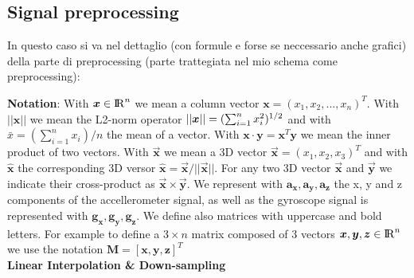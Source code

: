 \subsection{Signal preprocessing}

In questo caso si va nel dettaglio (con formule e forse se neccessario anche grafici) della parte di preprocessing (parte trattegiata nel mio schema come preprocessing):

\textbf{Notation}: With $\boldsymbol{x} \in {\rm I\!R}^{n}$ we mean a column vector $\boldsymbol{x}=(x_{1}, x_{2}, ..., x_{n})^{T}$.  With $\boldsymbol{||x||}$ we mean the L2-norm operator $||\boldsymbol{x}|| = (\sum_{i=1}^{n} x_{i}^{2})^{1/2}$ and with $\bar{x} = (\sum_{i=1}^{n} x_{i}) / n$ the mean of a vector. With $\boldsymbol{x} \cdot \boldsymbol{y} =\boldsymbol{x}^{T}\boldsymbol{y} $ we mean the inner product of two vectors. With $\boldsymbol{\vec{x}}$ we mean a 3D vector $\boldsymbol{\vec{x}} = (x_{1}, x_{2}, x_{3})^{T}$ and with $\boldsymbol{\hat{x}}$ the corresponding 3D versor $\boldsymbol{\hat{x}}=\boldsymbol{\vec{x}}/ ||\boldsymbol{\vec{x}}||$. For any two 3D vector $\boldsymbol{\vec{x}}$ and $\boldsymbol{\vec{y}}$ we indicate their cross-product as $\boldsymbol{\vec{x}} \times \boldsymbol{\vec{y}}$. We represent with $\boldsymbol{a_{x}}, \boldsymbol{a_{y}}, \boldsymbol{a_{z}}$ the x, y and z components of the accellerometer signal, as well as the gyroscope signal is represented with $\boldsymbol{g_{x}}, \boldsymbol{g_{y}}, \boldsymbol{g_{z}}$. We define also matrices with uppercase and bold letters. For example to define a $3 \times n$ matrix composed of 3 vectors $\boldsymbol{x}, \boldsymbol{y}, \boldsymbol{z} \in {\rm I\!R}^{n}$ we use the notation $\boldsymbol{M} = [\boldsymbol{x}, \boldsymbol{y}, \boldsymbol{z}]^{T}$\\

\textbf{Linear Interpolation \& Down-sampling}\\

